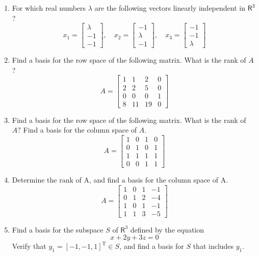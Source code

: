\documentclass[../main.tex]{subfiles}
\begin{document}
\begin{enumerate}[label=\textbf{3.\arabic*}, noitemsep]
\item For which real numbers $\lambda$ are the following vectors linearly independent in $\mathsf{R^{3}}$ ?
$$
x_{1}=\left[\begin{array}{c}
\lambda \\
-1 \\
-1
\end{array}\right], \quad x_{2}=\left[\begin{array}{c}
-1 \\
\lambda \\
-1
\end{array}\right], \quad x_{3}=\left[\begin{array}{c}
-1 \\
-1 \\
\lambda
\end{array}\right]
$$

\item Find a basis for the row space of the following matrix. What is the rank of $A$ ?
$$
A=\left[\begin{array}{cccc}
1 & 1 & 2 & 0 \\
2 & 2 & 5 & 0 \\
0 & 0 & 0 & 1 \\
8 & 11 & 19 & 0
\end{array}\right]
$$

\item Find a basis for the row space of the following matrix. What is the rank of $A ?$ Find a basis for the column space of $A$.
$$
A=\left[\begin{array}{llll}
1 & 0 & 1 & 0 \\
0 & 1 & 0 & 1 \\
1 & 1 & 1 & 1 \\
0 & 0 & 1 & 1
\end{array}\right]
$$


\item Determine the rank of A, and find a basis for the column space of A.
$$
A=\left[\begin{array}{llll}
1 & 0 & 1 & -1 \\
0 & 1 & 2 & -4 \\
1 & 0 & 1 & -1 \\
1 & 1 & 3 & -5
\end{array}\right]
$$

\item Find a basis for the subspace $S$ of $\mathsf{R}^{3}$ defined by the equation
$$
x+2 y+3 z=0
$$
Verify that $y_{1}=[-1,-1,1]^{\mathrm{T}} \in S$, and find a basis for $S$ that includes $y_{1}$.


\end{enumerate}
\end{document}
